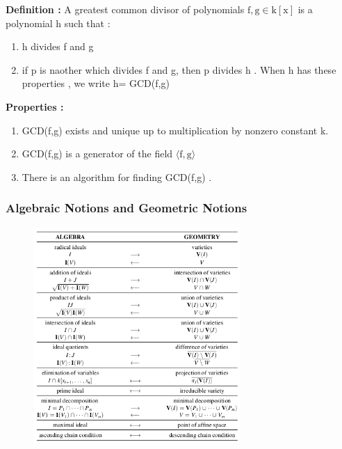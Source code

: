 \documentclass[11pt]{article}
\begin{document}
\textbf{Definition :}\newline
A greatest common divisor of polynomials $\mathrm{ f,g \in k[x]}$ is a polynomial h such that :
\begin{enumerate}
\item h divides f and g 
\item if p is naother which divides f and g, then p divides h . When h has these properties , we write h= GCD(f,g)
\end{enumerate}

\textbf{Properties :}\newline
\begin{enumerate}
\item GCD(f,g) exists and unique up to multiplication by nonzero constant k. 
\item GCD(f,g) is a generator of the field $\mathrm{\langle f,g \rangle}$
\item There is an algorithm for finding GCD(f,g) .
\end{enumerate}





\subsubsection{Algebraic Notions and Geometric Notions}
\begin{figure}[H]
  \begin{center}
    \includegraphics[width=0.7\textwidth]{algebra_geometry.png}
    \caption{}
    \label{fig: }
  \end{center}
\end{figure}
\end{document}
